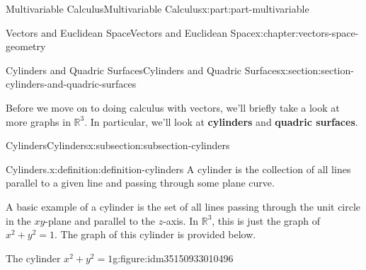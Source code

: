 \documentclass[twoside,10pt,]{tufte-book}
\newcommand{\terminology}[1]{\textbf{#1}}
\numberwithin{equation}{part}
\newlength{\qrsize}
\newlength{\previewwidth}
\newcommand{\RR}{\mathbb{R}}
\begin{document}
\begin{partptx}{Multivariable Calculus}{}{Multivariable Calculus}{}{}{x:part:part-multivariable}
\begin{chapterptx}{Vectors and Euclidean Space}{}{Vectors and Euclidean Space}{}{}{x:chapter:vectors-space-geometry}
%
%
\typeout{************************************************}
\typeout{************************************************}
%
\begin{sectionptx}{Cylinders and Quadric Surfaces}{}{Cylinders and Quadric Surfaces}{}{}{x:section:section-cylinders-and-quadric-surfaces}
\begin{introduction}{}%
Before we move on to doing calculus with vectors, we'll briefly take a look at more graphs in \(\RR^{3}\). In particular, we'll look at \terminology{cylinders} and \terminology{quadric surfaces}.%
\end{introduction}%
%
%
\typeout{************************************************}
\typeout{************************************************}
%
\begin{subsectionptx}{Cylinders}{}{Cylinders}{}{}{x:subsection:subsection-cylinders}
\begin{definition}{Cylinders.}{x:definition:definition-cylinders}%
%
A cylinder is the collection of all lines parallel to a given line and passing through some plane curve.%
\end{definition}
A basic example of a cylinder is the set of all lines passing through the unit circle in the \(xy\)-plane and parallel to the \(z\)-axis. In \(\RR^{3}\), this is just the graph of \(x^{2}+y^{2}=1\). The graph of this cylinder is provided below.%
\begin{figureptx}{The cylinder \(x^2+y^2=1\)}{g:figure:idm35150933010496}{}%
\centering
\setlength{\qrsize}{9em}
\setlength{\previewwidth}{\linewidth}
\addtolength{\previewwidth}{-\qrsize}
\begin{tcbraster}[raster columns=2, raster column skip=1pt, raster halign=center, raster force size=false, raster left skip=0pt, raster right skip=0pt]%
\begin{tcolorbox}[previewstyle, width=\previewwidth]%
%

\end{tcolorbox}
\end{tcbraster}
\end{figureptx}
\end{subsectionptx}
\end{sectionptx}
\end{chapterptx}
\end{partptx}
\end{document}
